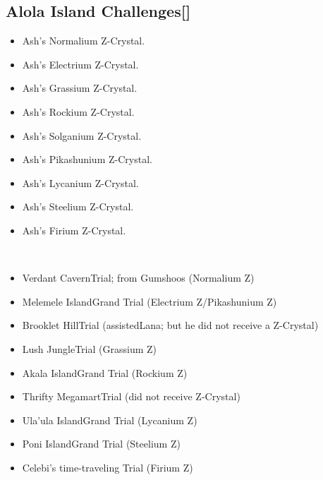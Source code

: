 \documentclass[a4paper,12pt]{article}
\begin{document}
\subsection*{Alola Island Challenges[]}\n\n\begin{itemize}
\item Ash's Normalium Z-Crystal.
\item Ash's Electrium Z-Crystal.
\item Ash's Grassium Z-Crystal.
\item Ash's Rockium Z-Crystal.
\item Ash's Solganium Z-Crystal.
\item Ash's Pikashunium Z-Crystal.
\item Ash's Lycanium Z-Crystal.
\item Ash's Steelium Z-Crystal.
\item Ash's Firium Z-Crystal.
\end{itemize}\\ \par \vspace{0.5cm}

\begin{itemize}
\item Verdant CavernTrial; from Gumshoos (Normalium Z)
\item Melemele IslandGrand Trial (Electrium Z/Pikashunium Z)
\item Brooklet HillTrial (assistedLana; but he did not receive a Z-Crystal)
\item Lush JungleTrial (Grassium Z)
\item Akala IslandGrand Trial (Rockium Z)
\item Thrifty MegamartTrial (did not receive Z-Crystal)
\item Ula'ula IslandGrand Trial (Lycanium Z)
\item Poni IslandGrand Trial (Steelium Z)
\item Celebi's time-traveling Trial (Firium Z)
\end{itemize}\\ \par \vspace{0.5cm}
\end{document}
